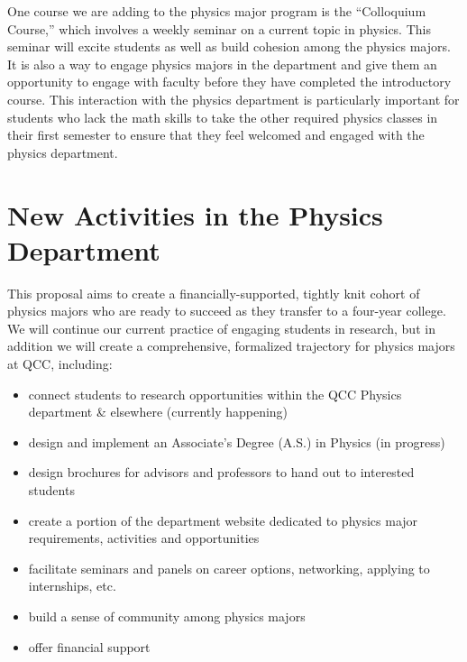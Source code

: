 \documentclass[12pt]{article}
\begin{document}
One course we are adding to the physics major program is the ``Colloquium Course,'' which involves a weekly seminar on a current topic in physics.  This seminar will excite students as well as build cohesion among the physics majors.  It is also a way to engage physics majors in the department and give them an opportunity to engage with faculty before they have completed the introductory course.  This interaction with the physics department is particularly important for students who lack the math skills to take the other required physics classes in their first semester to ensure that they feel welcomed and engaged with the physics department.

\section{New Activities in the Physics Department}

This proposal aims to create a financially-supported, tightly knit cohort of physics majors who are ready to succeed as they transfer to a four-year college.  We will continue our current practice of engaging students in research, but in addition we will  create a comprehensive, formalized trajectory for physics majors at QCC, including:
\vspace{-2mm}

\begin{itemize}
\setlength{\itemsep}{-\parsep}
\setlength{\topsep}{-\parsep}
\setlength{\partopsep}{-\parsep}
	\item connect students to research opportunities within the QCC Physics department \& elsewhere (currently happening)
	\item design and implement an Associate's Degree (A.S.) in Physics (in progress)
	\item design brochures for advisors and professors to hand out to interested students
	\item create a portion of the department website dedicated to physics major requirements, activities and opportunities
	\item facilitate seminars and panels on career options, networking, applying to internships, etc.
	\item build a sense of community among physics majors 
	\item offer financial support 	
\end{itemize}	
	
\end{document}
